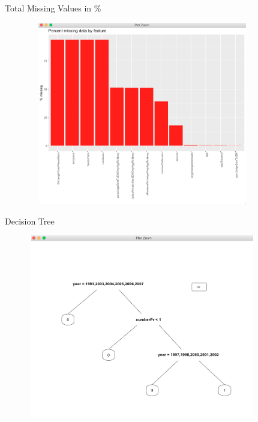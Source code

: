 \documentclass{beamer}
\begin{document}
\begin{frame}{Total Missing Values in \%}
      \begin{figure}        
\centering
\includegraphics[width=10cm, height = 8cm]{Missing_values.JPEG}
\end{figure}
\end{frame}

\begin{frame}{Decision Tree}
      \begin{figure}        
\centering
\includegraphics[width=10cm, height = 8cm]{TREE.JPEG}
\end{figure}
\end{frame}
\end{document}
